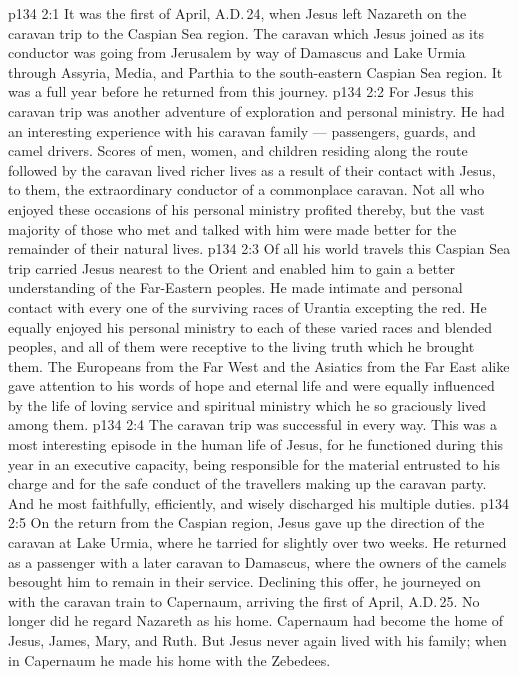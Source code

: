 \vs p134 2:1 It was the first of April, A.D.\,24, when Jesus left Nazareth on the caravan trip to the Caspian Sea region. The caravan which Jesus joined as its conductor was going from Jerusalem by way of Damascus and Lake Urmia through Assyria, Media, and Parthia to the south\hyp{}eastern Caspian Sea region. It was a full year before he returned from this journey.
\vs p134 2:2 For Jesus this caravan trip was another adventure of exploration and personal ministry. He had an interesting experience with his caravan family --- passengers, guards, and camel drivers. Scores of men, women, and children residing along the route followed by the caravan lived richer lives as a result of their contact with Jesus, to them, the extraordinary conductor of a commonplace caravan. Not all who enjoyed these occasions of his personal ministry profited thereby, but the vast majority of those who met and talked with him were made better for the remainder of their natural lives.
\vs p134 2:3 Of all his world travels this Caspian Sea trip carried Jesus nearest to the Orient and enabled him to gain a better understanding of the Far\hyp{}Eastern peoples. He made intimate and personal contact with every one of the surviving races of Urantia excepting the red. He equally enjoyed his personal ministry to each of these varied races and blended peoples, and all of them were receptive to the living truth which he brought them. The Europeans from the Far West and the Asiatics from the Far East alike gave attention to his words of hope and eternal life and were equally influenced by the life of loving service and spiritual ministry which he so graciously lived among them.
\vs p134 2:4 \pc The caravan trip was successful in every way. This was a most interesting episode in the human life of Jesus, for he functioned during this year in an executive capacity, being responsible for the material entrusted to his charge and for the safe conduct of the travellers making up the caravan party. And he most faithfully, efficiently, and wisely discharged his multiple duties.
\vs p134 2:5 On the return from the Caspian region, Jesus gave up the direction of the caravan at Lake Urmia, where he tarried for slightly over two weeks. He returned as a passenger with a later caravan to Damascus, where the owners of the camels besought him to remain in their service. Declining this offer, he journeyed on with the caravan train to Capernaum, arriving the first of April, A.D.\,25. No longer did he regard Nazareth as his home. Capernaum had become the home of Jesus, James, Mary, and Ruth. But Jesus never again lived with his family; when in Capernaum he made his home with the Zebedees.
